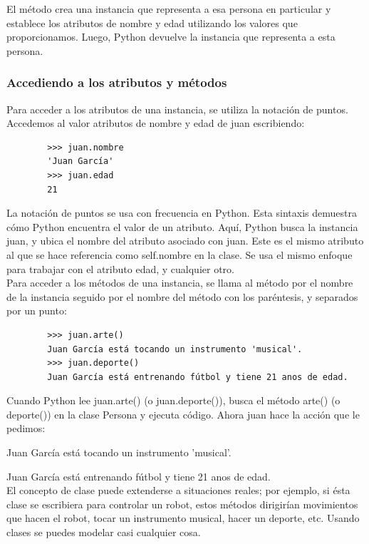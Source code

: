 {{	El método crea una instancia que representa a esa persona en particular y establece los atributos de {\ttfamily nombre} y  {\ttfamily edad}  utilizando los valores que proporcionamos. Luego, Python devuelve la instancia que representa a esta persona. 
	
	\subsubsection{Accediendo a los atributos y métodos}
	
	Para acceder a los atributos de una instancia, se utiliza la notación de puntos. Accedemos al valor atributos de {\ttfamily nombre} y  {\ttfamily edad}  de {\ttfamily juan} escribiendo:
	
	\begin{lstlisting}
		>>> juan.nombre
		'Juan García'
		>>> juan.edad
		21
	\end{lstlisting}
	
	La notación de puntos se usa con frecuencia en Python. Esta sintaxis demuestra cómo Python encuentra el valor de un atributo. Aquí, Python busca la instancia {\ttfamily juan}, y ubica el nombre del atributo asociado con juan. Este es el mismo atributo al que se hace referencia como {\ttfamily self.nombre} en la clase. Se usa el mismo enfoque para trabajar con el atributo {\ttfamily edad}, y cualquier otro. \\
	
	Para acceder a los métodos de una instancia, se llama al método por el nombre de la instancia seguido por el nombre del método con los paréntesis, y separados por un punto:  
	
	\begin{lstlisting}
		>>> juan.arte()
		Juan García está tocando un instrumento 'musical'.
		>>> juan.deporte()
		Juan García está entrenando fútbol y tiene 21 anos de edad.
	\end{lstlisting}
	
	Cuando Python lee {\ttfamily juan.arte()} (o {\ttfamily juan.deporte()}), busca el método {\ttfamily arte()}   (o {\ttfamily deporte()}) en la clase {\ttfamily Persona} y ejecuta código.
	Ahora juan hace la acción que le pedimos: 
	
	Juan García está tocando un instrumento 'musical'. 
	
	Juan García está entrenando fútbol y tiene 21 anos de edad.\\
	
	
	El concepto de clase puede  extenderse a situaciones reales; por ejemplo, si ésta clase se escribiera para controlar un robot, estos métodos dirigirían movimientos que hacen el robot,  tocar un instrumento musical, hacer un deporte, etc. Usando clases se puedes modelar casi cualquier cosa.
	
}}

